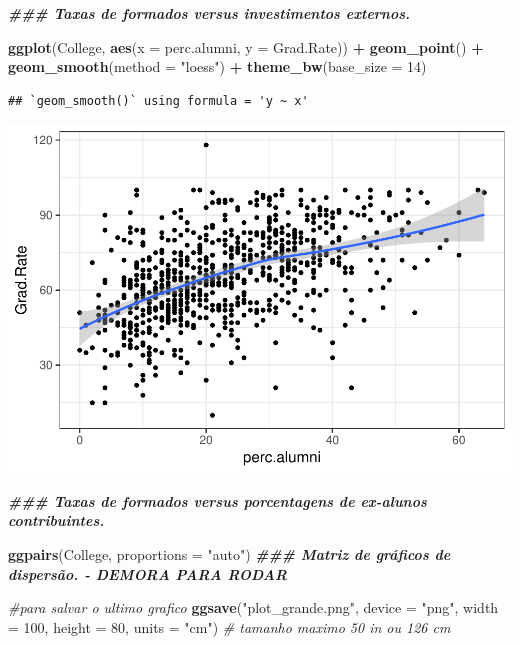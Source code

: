 \documentclass[
]{article}
\newenvironment{Shaded}{\begin{snugshade}}{\end{snugshade}}
\newcommand{\AttributeTok}[1]{\textcolor[rgb]{0.13,0.29,0.53}{#1}}
\newcommand{\CommentTok}[1]{\textcolor[rgb]{0.56,0.35,0.01}{\textit{#1}}}
\newcommand{\DecValTok}[1]{\textcolor[rgb]{0.00,0.00,0.81}{#1}}
\newcommand{\DocumentationTok}[1]{\textcolor[rgb]{0.56,0.35,0.01}{\textbf{\textit{#1}}}}
\newcommand{\FunctionTok}[1]{\textcolor[rgb]{0.13,0.29,0.53}{\textbf{#1}}}
\newcommand{\NormalTok}[1]{#1}
\newcommand{\SpecialCharTok}[1]{\textcolor[rgb]{0.81,0.36,0.00}{\textbf{#1}}}
\newcommand{\StringTok}[1]{\textcolor[rgb]{0.31,0.60,0.02}{#1}}
\begin{document}
\begin{Shaded}
\begin{Highlighting}[]
\DocumentationTok{\#\#\# Taxas de formados versus investimentos externos.}

\FunctionTok{ggplot}\NormalTok{(College, }\FunctionTok{aes}\NormalTok{(}\AttributeTok{x =}\NormalTok{ perc.alumni, }\AttributeTok{y =}\NormalTok{ Grad.Rate)) }\SpecialCharTok{+} \FunctionTok{geom\_point}\NormalTok{() }\SpecialCharTok{+}
    \FunctionTok{geom\_smooth}\NormalTok{(}\AttributeTok{method =} \StringTok{"loess"}\NormalTok{) }\SpecialCharTok{+}
    \FunctionTok{theme\_bw}\NormalTok{(}\AttributeTok{base\_size =} \DecValTok{14}\NormalTok{)}
\end{Highlighting}
\end{Shaded}

\begin{verbatim}
## `geom_smooth()` using formula = 'y ~ x'
\end{verbatim}

\includegraphics{Modelos_Estatisticos-2024-08-10_files/figure-latex/unnamed-chunk-6-4.pdf}

\begin{Shaded}
\begin{Highlighting}[]
\DocumentationTok{\#\#\# Taxas de formados versus porcentagens de ex{-}alunos contribuintes.}
\end{Highlighting}
\end{Shaded}

\begin{Shaded}
\begin{Highlighting}[]
\FunctionTok{ggpairs}\NormalTok{(College, }\AttributeTok{proportions =} \StringTok{"auto"}\NormalTok{) }\DocumentationTok{\#\#\# Matriz de gráficos de dispersão. {-} DEMORA PARA RODAR}

\CommentTok{\#para salvar o ultimo grafico}
\FunctionTok{ggsave}\NormalTok{(}\StringTok{"plot\_grande.png"}\NormalTok{, }\AttributeTok{device =} \StringTok{"png"}\NormalTok{, }\AttributeTok{width =} \DecValTok{100}\NormalTok{, }\AttributeTok{height =} \DecValTok{80}\NormalTok{, }\AttributeTok{units =} \StringTok{"cm"}\NormalTok{)}
\CommentTok{\# tamanho maximo 50 in ou 126 cm}
\end{Highlighting}
\end{Shaded}
\end{document}

